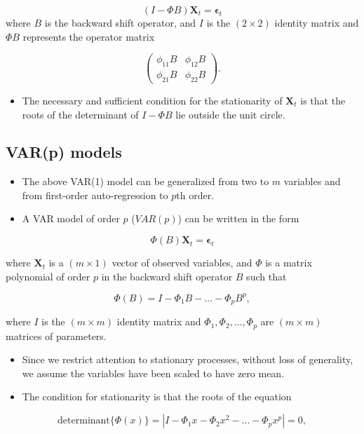 \documentclass[]{book}
\providecommand{\tightlist}{%
  \setlength{\itemsep}{0pt}\setlength{\parskip}{0pt}}
\begin{document}
\[(I-\Phi B)\mathbf{X}_t=\symbf{\epsilon}_t\]
where \(B\) is the backward shift operator, and \(I\) is the \((2\times2)\) identity matrix and \(\Phi B\) represents the operator matrix

\[
\begin{pmatrix}
  \phi_{11}B &  \phi_{12}B\\ 
   \phi_{21}B &  \phi_{22}B
\end{pmatrix}.
\]

\begin{itemize}
\tightlist
\item
  The necessary and sufficient condition for the stationarity of \(\mathbf{X}_t\) is that the roots of the determinant of \(I-\Phi B\) lie outside the unit circle.
\end{itemize}

\hypertarget{varp-models}{%
\subsection{VAR(p) models}\label{varp-models}}

\begin{itemize}
\tightlist
\item
  The above VAR(1) model can be generalized from two to \(m\) variables and from first-order auto-regression to \(p\)th order.
\item
  A VAR model of order \(p\) (\(VAR(p)\)) can be written in the form
\end{itemize}

\[\Phi(B)\mathbf{X}_t=\symbf{\epsilon}_t\]

where \(\mathbf{X}_t\) is a \((m\times1)\) vector of observed variables, and \(\Phi\) is a matrix polynomial of order \(p\) in the backward shift operator \(B\) such that

\[\Phi(B)=I-\Phi_1B-\dots-\Phi_pB^p,\]

where \(I\) is the \((m\times m)\) identity matrix and \(\Phi_1, \Phi_2, \dots, \Phi_p\) are \((m\times m)\) matrices of parameters.

\begin{itemize}
\tightlist
\item
  Since we restrict attention to stationary processes, without loss of generality, we assume the variables have been scaled to have zero mean.
\item
  The condition for stationarity is that the roots of the equation
\end{itemize}

\[\text{determinant}\{\Phi(x)\}=|I-\Phi_1x-\Phi_2x^2-\dots-\Phi_px^p|=0,\]
\end{document}
